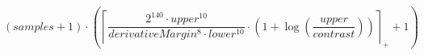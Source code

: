 \[\left(samples + 1\right) \cdot \left(\left\lceil \frac{2^{140} \cdot upper^{10}}{derivativeMargin^{8} \cdot lower^{10}} \cdot \left(1 + \log\left(\frac{upper}{contrast}\right)\right) \right\rceil_{+} + 1\right)\]
